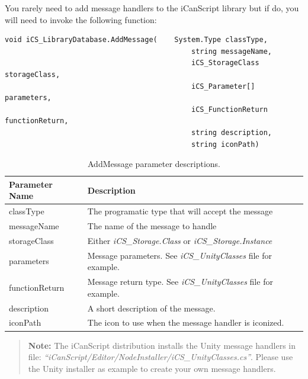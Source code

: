 You rarely need to add message handlers to the iCanScript library but if do, you will need to invoke the following function:

\begin{verbatim}
void iCS_LibraryDatabase.AddMessage(    System.Type classType,
                                            string messageName,
                                            iCS_StorageClass storageClass,
                                            iCS_Parameter[] parameters,
                                            iCS_FunctionReturn functionReturn,
                                            string description,
                                            string iconPath)
\end{verbatim}

\begin{table}[htbp]
\begin{minipage}{\linewidth}
\setlength{\tymax}{0.5\linewidth}
\centering
\small
\caption{AddMessage parameter descriptions.}
\label{addmessageparameterdescriptions.}
\begin{tabulary}{\textwidth}{@{}LL@{}} \toprule
Parameter Name&Description\\
\midrule
classType&The programatic type that will accept the message\\
messageName&The name of the message to handle\\
storageClass&Either \emph{iCS\_Storage.Class} or \emph{iCS\_Storage.Instance}\\
parameters&Message parameters. See \emph{iCS\_UnityClasses} file for example.\\
functionReturn&Message return type. See \emph{iCS\_UnityClasses} file for example.\\
description&A short description of the message.\\
iconPath&The icon to use when the message handler is iconized.\\

\bottomrule

\end{tabulary}
\end{minipage}
\end{table}

\begin{quote}

\textbf{Note:} The iCanScript distribution installs the Unity message handlers in file: \emph{``iCanScript\slash Editor\slash NodeInstaller\slash iCS\_UnityClasses.cs''}. Please use the Unity installer as example to create your own message handlers.
\end{quote}

